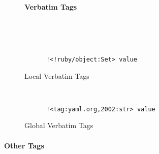 \begin{figure}[H]
\paragraph{Verbatim Tags}~\\
  \begin{minipage}[t]{0.48\textwidth}
    \vspace{0pt}
    \begin{bchart}[max=9, width=0.85\textwidth]
    \end{bchart}
  \end{minipage}
  \begin{minipage}[t]{0pt}~\end{minipage}
  \begin{minipage}[t]{0.48\textwidth}
    \vspace{0pt}
    \begin{verbatim}
      !<!ruby/object:Set> value
    \end{verbatim}
  \end{minipage}
  \caption{Local Verbatim Tags}
\end{figure}

\begin{figure}[H]
  \begin{minipage}[t]{0.48\textwidth}
    \vspace{0pt}
    \begin{bchart}[max=9, width=0.85\textwidth]
    \end{bchart}
  \end{minipage}
  \begin{minipage}[t]{0pt}~\end{minipage}
  \begin{minipage}[t]{0.48\textwidth}
    \vspace{0pt}
    \begin{verbatim}
      !<tag:yaml.org,2002:str> value
    \end{verbatim}
  \end{minipage}
  \caption{Global Verbatim Tags}
\end{figure}

\paragraph{Other Tags}~\\

